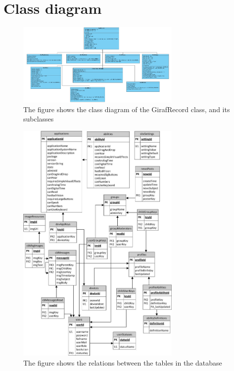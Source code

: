\chapter{Class diagram}
\label{diagramAppendix}

\begin{figure}[ht]
\centering
\includegraphics[angle=90,width=300px]{img/classdiagram_Fixed.jpg}
\caption{The figure shows the class diagram of the GirafRecord class, and its subclasses}
\label{fig:diagram}
\end{figure}

\begin{figure}[ht]
\centering
\includegraphics[angle=0,width=300px]{img/ER-relation(1).jpg}
\caption{The figure shows the relations between the tables in the database}
\label{fig:database_relations}
\end{figure}